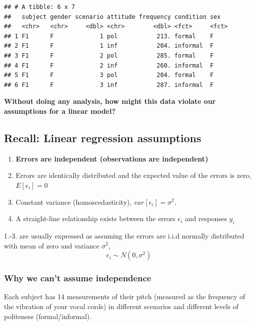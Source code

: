 \documentclass[
  openany]{book}
\providecommand{\tightlist}{%
  \setlength{\itemsep}{0pt}\setlength{\parskip}{0pt}}
\begin{document}
\begin{verbatim}
## # A tibble: 6 x 7
##   subject gender scenario attitude frequency condition sex  
##   <chr>   <chr>     <dbl> <chr>        <dbl> <fct>     <fct>
## 1 F1      F             1 pol           213. formal    F    
## 2 F1      F             1 inf           204. informal  F    
## 3 F1      F             2 pol           285. formal    F    
## 4 F1      F             2 inf           260. informal  F    
## 5 F1      F             3 pol           204. formal    F    
## 6 F1      F             3 inf           287. informal  F
\end{verbatim}

\textbf{Without doing any analysis, how might this data violate our assumptions for a linear model?}

\hypertarget{recall-linear-regression-assumptions}{%
\subsection{Recall: Linear regression assumptions}\label{recall-linear-regression-assumptions}}

\begin{enumerate}
\def\labelenumi{\arabic{enumi}.}
\tightlist
\item
  \textbf{Errors are independent (observations are independent)}
\item
  Errors are identically distributed and the expected value of the errors is zero, \(E[\epsilon_i]=0\)
\item
  Constant variance (homoscedasticity), \(var[\epsilon_i] = \sigma^2\).
\item
  A straight-line relationship exists between the errors \(\epsilon_i\) and responses \(y_i\)
\end{enumerate}

1.-3. are usually expressed as assuming the errors are i.i.d normally distributed with mean of zero and variance \(\sigma^2\),
\[\epsilon_i \sim N(0, \sigma^2)\]

\hypertarget{why-we-cant-assume-independence}{%
\subsubsection{Why we can't assume independence}\label{why-we-cant-assume-independence}}

Each subject has 14 measurements of their pitch (measured as the frequency of the vibration of your vocal cords) in different scenarios and different levels of politeness (formal/informal).
\end{document}
